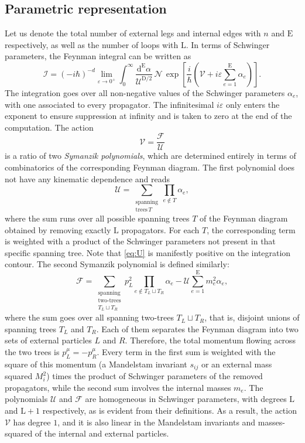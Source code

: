 \documentclass[12pt]{article}
\numberwithin{figure}{section}
\def \be {\begin{equation}}
\def \ee {\end{equation}}
\def \D {\mathrm{D}}
\def \E {\mathrm{E}}
\def \L {\mathrm{L}}
\def \U {\mathcal{U}}
\def \F {\mathcal{F}}
\def \d {\mathrm{d}}
\def \eps {\varepsilon}
\def \V {\mathcal{V}}
\def \I {\mathcal{I}}
\def \N {\mathcal{N}}
\begin{document}
	\subsection{\label{sec:parametric}Parametric representation}
	Let us denote the total number of external legs and internal edges with $n$ and $\E$ respectively, as well as the number of loops with $\L$. In terms of Schwinger parameters, the
	Feynman integral can be written as
	\be\label{eq:general-I}
		\I = (-i\hbar)^{-d} \lim_{\eps \to 0^+} \int_0^\infty \frac{\d^{\E} \alpha}{\U^{\D/2}}\, \N\, \exp \left[ \frac{i}{\hbar} \left(\V + i\eps \textstyle\sum_{e=1}^{\E}\alpha_e \right)\right].
	\ee
	The integration goes over all non-negative values of the Schwinger parameters $\alpha_e$, with one associated to every propagator. The infinitesimal $i\eps$ only enters the exponent to ensure suppression at infinity and is taken to zero at the end of the computation. The action
	\be\label{eq:V}
	\V = \frac{\F}{\U}
	\ee
	is a ratio of two \emph{Symanzik polynomials}, which are determined entirely in terms of combinatorics of the corresponding Feynman diagram. The first polynomial does not have any kinematic dependence and reads 
	\be\label{eq:U}
	\U = \sum_{\substack{\mathrm{spanning}\\ \mathrm{trees }\,T}} \prod_{e \notin T} \alpha_e,
	\ee
	where the sum runs over all possible spanning trees $T$ of the Feynman diagram obtained by removing exactly $\L$ propagators. For each $T$, the corresponding term is weighted with a product of the Schwinger parameters not present in that specific spanning tree. Note that \eqref{eq:U} is manifestly positive on the integration contour.
	The second Symanzik polynomial is defined similarly:
	\be\label{eq:F}
	\F = \sum_{\substack{\mathrm{spanning}\\ \text{two-trees}\\ T_L \sqcup T_R}} p_L^2 \prod_{e \notin T_L \sqcup T_R} \alpha_e - \U \sum_{e=1}^{\E} m_e^2 \alpha_e,
	\ee
	where the sum goes over all spanning two-trees $T_L \sqcup T_R$, that is, disjoint unions of spanning trees $T_L$ and $T_R$. Each of them separates the Feynman diagram into two sets of external particles $L$ and $R$. Therefore, the total momentum flowing across the two trees is $p_L^\mu = - p_R^\mu$. Every term in the first sum is weighted with the square of this momentum (a Mandelstam invariant $s_{ij}$ or an external mass squared $M_i^2$) times the product of Schwinger parameters of the removed propagators, while the second sum involves the internal masses $m_e$. The polynomials $\U$ and $\F$ are homogeneous in Schwinger parameters, with degrees $\L$ and $\L{+}1$ respectively, as is evident from their definitions. As a result, the action $\V$ has degree $1$, and it is also linear in the Mandelstam invariants and masses-squared of the internal and external particles.
	
\end{document}
